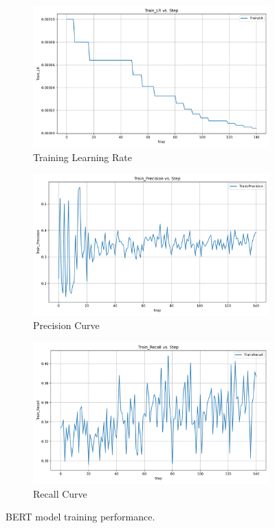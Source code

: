 \documentclass[12pt]{article}
\begin{document}
\begin{figure}[H]
	\begin{subfigure}[b]{0.32\textwidth}
		\includegraphics[width=\linewidth]{Train_LR.png}
		\caption{Training Learning Rate}
	\end{subfigure}
	\hfill
	\begin{subfigure}[b]{0.32\textwidth}
		\includegraphics[width=\linewidth]{Train_Precision.png}
		\caption{Precision Curve}
	\end{subfigure}
	\hfill
	\begin{subfigure}[b]{0.32\textwidth}
		\includegraphics[width=\linewidth]{Train_Recall.png}
		\caption{Recall Curve}
	\end{subfigure}
	\caption{BERT model training performance.}
	\label{fig:bert_training_performance}
\end{figure}
\end{document}
